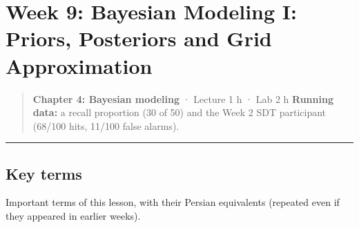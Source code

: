 \section{Week 9: Bayesian Modeling I: Priors, Posteriors and Grid
Approximation}

\begin{quote}
\textbf{Chapter 4: Bayesian modeling} · Lecture 1 h · Lab 2 h
\textbf{Running data:} a recall proportion (30 of 50) and the Week 2 SDT
participant (68/100 hits, 11/100 false alarms).
\end{quote}

\begin{center}\rule{0.5\linewidth}{0.5pt}\end{center}

\subsection{Key terms}

Important terms of this lesson, with their Persian equivalents (repeated
even if they appeared in earlier weeks).

